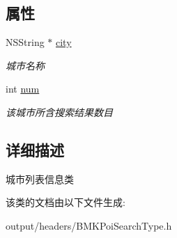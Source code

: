 \subsection*{属性}
\begin{DoxyCompactItemize}
\item 
\hypertarget{interface_b_m_k_city_list_info_ad1b2093344ad0524a9bef93c823f8242}{}N\+S\+String $\ast$ \hyperlink{interface_b_m_k_city_list_info_ad1b2093344ad0524a9bef93c823f8242}{city}\label{interface_b_m_k_city_list_info_ad1b2093344ad0524a9bef93c823f8242}

\begin{DoxyCompactList}\small\item\em 城市名称 \end{DoxyCompactList}\item 
\hypertarget{interface_b_m_k_city_list_info_a63163c524339e1687d90541b3a24b54c}{}int \hyperlink{interface_b_m_k_city_list_info_a63163c524339e1687d90541b3a24b54c}{num}\label{interface_b_m_k_city_list_info_a63163c524339e1687d90541b3a24b54c}

\begin{DoxyCompactList}\small\item\em 该城市所含搜索结果数目 \end{DoxyCompactList}\end{DoxyCompactItemize}


\subsection{详细描述}
城市列表信息类 

该类的文档由以下文件生成\+:\begin{DoxyCompactItemize}
\item 
output/headers/B\+M\+K\+Poi\+Search\+Type.\+h\end{DoxyCompactItemize}
